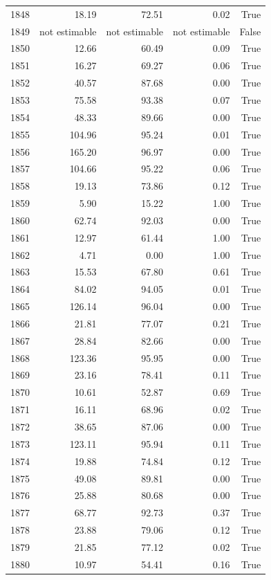 \begin{longtable}{rrrrr}
1848 & 18.19 & 72.51 & 0.02 & True \\
1849 & not estimable & not estimable & not estimable & False \\
1850 & 12.66 & 60.49 & 0.09 & True \\
1851 & 16.27 & 69.27 & 0.06 & True \\
1852 & 40.57 & 87.68 & 0.00 & True \\
1853 & 75.58 & 93.38 & 0.07 & True \\
1854 & 48.33 & 89.66 & 0.00 & True \\
1855 & 104.96 & 95.24 & 0.01 & True \\
1856 & 165.20 & 96.97 & 0.00 & True \\
1857 & 104.66 & 95.22 & 0.06 & True \\
1858 & 19.13 & 73.86 & 0.12 & True \\
1859 & 5.90 & 15.22 & 1.00 & True \\
1860 & 62.74 & 92.03 & 0.00 & True \\
1861 & 12.97 & 61.44 & 1.00 & True \\
1862 & 4.71 & 0.00 & 1.00 & True \\
1863 & 15.53 & 67.80 & 0.61 & True \\
1864 & 84.02 & 94.05 & 0.01 & True \\
1865 & 126.14 & 96.04 & 0.00 & True \\
1866 & 21.81 & 77.07 & 0.21 & True \\
1867 & 28.84 & 82.66 & 0.00 & True \\
1868 & 123.36 & 95.95 & 0.00 & True \\
1869 & 23.16 & 78.41 & 0.11 & True \\
1870 & 10.61 & 52.87 & 0.69 & True \\
1871 & 16.11 & 68.96 & 0.02 & True \\
1872 & 38.65 & 87.06 & 0.00 & True \\
1873 & 123.11 & 95.94 & 0.11 & True \\
1874 & 19.88 & 74.84 & 0.12 & True \\
1875 & 49.08 & 89.81 & 0.00 & True \\
1876 & 25.88 & 80.68 & 0.00 & True \\
1877 & 68.77 & 92.73 & 0.37 & True \\
1878 & 23.88 & 79.06 & 0.12 & True \\
1879 & 21.85 & 77.12 & 0.02 & True \\
1880 & 10.97 & 54.41 & 0.16 & True \\

\end{longtable}
